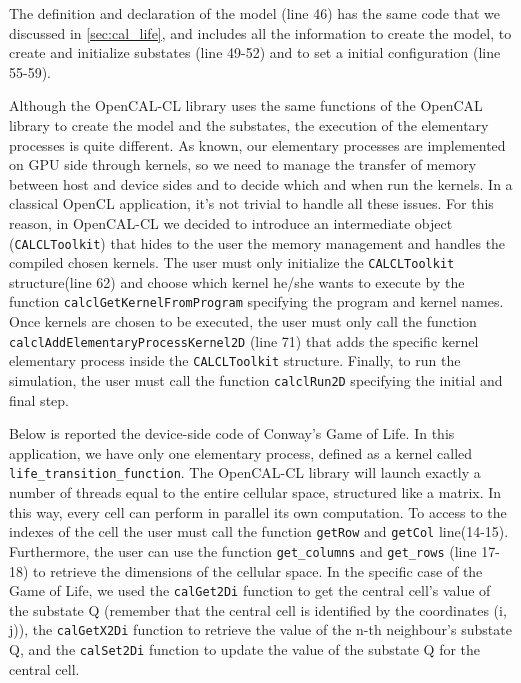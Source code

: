 The definition and declaration of the model (line 46) has the same code
that we discussed in \ref{sec:cal_life}, and includes all the information
to create the model, to create and initialize substates (line 49-52) and 
to set a initial configuration (line 55-59).


	
Although the OpenCAL-CL library uses the same functions of the OpenCAL
library to create the model and the substates, the execution of the
elementary processes is quite different. As known, our elementary
processes are implemented on GPU side through kernels, so we need to
manage the transfer of memory between host and device sides and to
decide which and when run the kernels. In a classical OpenCL
application, it's not trivial to handle all these issues. For this
reason, in OpenCAL-CL we decided to introduce an intermediate object
(\verb'CALCLToolkit') that hides to the user the memory management and
handles the compiled chosen kernels. The user must only initialize the
\verb'CALCLToolkit' structure(line 62) and choose which kernel he/she
wants to execute by the function \verb'calclGetKernelFromProgram'
specifying the program and kernel names. Once kernels are chosen to be
executed, the user must only call the function
\verb'calclAddElementaryProcessKernel2D' (line 71) that adds the
specific kernel elementary process inside the \verb'CALCLToolkit'
structure. Finally, to run the simulation, the user must call the
function \verb'calclRun2D' specifying the initial and final step.

Below is reported the device-side code of Conway's Game of Life.  In
this application, we have only one elementary process, defined as a
kernel called \verb'life_transition_function'. The OpenCAL-CL library
will launch exactly a number of threads equal to the entire cellular
space, structured like a matrix. In this way, every cell can perform
in parallel its own computation. To access to the indexes of the cell
the user must call the function \verb'getRow' and \verb'getCol'
line(14-15). Furthermore, the user can use the function
\verb'get_columns' and \verb'get_rows' (line 17-18) to retrieve the
dimensions of the cellular space.  In the specific case of the Game of
Life, we used the \verb'calGet2Di' function to get the central cell’s
value of the substate Q (remember that the central cell is identified
by the coordinates (i, j)), the \verb'calGetX2Di' function to retrieve
the value of the n-th neighbour’s substate Q, and the \verb'calSet2Di'
function to update the value of the substate Q for the central cell.

